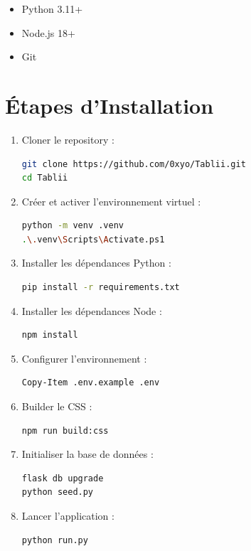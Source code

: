 \documentclass[12pt,a4paper]{report}
\begin{document}
\begin{itemize}
    \item Python 3.11+
    \item Node.js 18+
    \item Git
\end{itemize}

\section{Étapes d'Installation}

\begin{enumerate}
    \item Cloner le repository :
    \begin{lstlisting}[language=bash]
git clone https://github.com/0xyo/Tablii.git
cd Tablii
    \end{lstlisting}
    
    \item Créer et activer l'environnement virtuel :
    \begin{lstlisting}[language=bash]
python -m venv .venv
.\.venv\Scripts\Activate.ps1
    \end{lstlisting}
    
    \item Installer les dépendances Python :
    \begin{lstlisting}[language=bash]
pip install -r requirements.txt
    \end{lstlisting}
    
    \item Installer les dépendances Node :
    \begin{lstlisting}[language=bash]
npm install
    \end{lstlisting}
    
    \item Configurer l'environnement :
    \begin{lstlisting}[language=bash]
Copy-Item .env.example .env
    \end{lstlisting}
    
    \item Builder le CSS :
    \begin{lstlisting}[language=bash]
npm run build:css
    \end{lstlisting}
    
    \item Initialiser la base de données :
    \begin{lstlisting}[language=bash]
flask db upgrade
python seed.py
    \end{lstlisting}
    
    \item Lancer l'application :
    \begin{lstlisting}[language=bash]
python run.py
    \end{lstlisting}
\end{enumerate}
\end{document}
